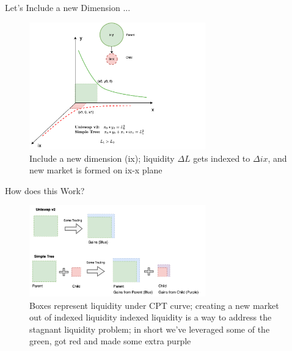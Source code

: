 \documentclass[10pt,xcolor=svgnames]{beamer} %
\begin{document}
\begin{frame}{Let's Include a new Dimension ...} 
 
\begin{figure}[h!]
\includegraphics[width=3in]{img/simple_tree.png}
\caption{Include a new dimension (ix); liquidity $\Delta L$ gets indexed to $\Delta ix$, and new market is formed on ix-x plane} 
\label{fig:simple_tree}
\end{figure}

\end{frame}

\begin{frame}{How does this Work?} 

\begin{figure}[h!]
\includegraphics[width=3in]{img/compare.png}
\caption{Boxes represent liquidity under CPT curve; creating a new market out of indexed liquidity indexed liquidity is a way to address the stagnant liquidity problem; in short we've leveraged some of the green, got red and made some extra purple} 
\label{fig:compare}
\end{figure}

\end{frame}
\end{document}
